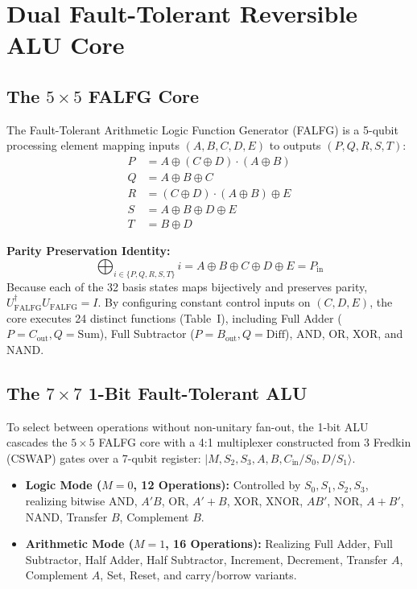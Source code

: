 \documentclass[10pt,twocolumn,letterpaper]{article}
\begin{document}
\section{Dual Fault-Tolerant Reversible ALU Core}

\subsection{The \texorpdfstring{$5\times 5$}{5x5} FALFG Core}
The Fault-Tolerant Arithmetic Logic Function Generator (FALFG) is a 5-qubit processing element mapping inputs $(A, B, C, D, E)$ to outputs $(P, Q, R, S, T)$:
\begin{align}
    P &= A \oplus (C \oplus D) \cdot (A \oplus B) \\
    Q &= A \oplus B \oplus C \\
    R &= (C \oplus D) \cdot (A \oplus B) \oplus E \\
    S &= A \oplus B \oplus D \oplus E \\
    T &= B \oplus D
\end{align}

\noindent\textbf{Parity Preservation Identity:}
\begin{equation}
    \bigoplus_{i \in \{P, Q, R, S, T\}} i = A \oplus B \oplus C \oplus D \oplus E = P_{\text{in}}
\end{equation}
Because each of the 32 basis states maps bijectively and preserves parity, $U_{\text{FALFG}}^\dagger U_{\text{FALFG}} = I$. By configuring constant control inputs on $(C, D, E)$, the core executes 24 distinct functions (Table~I), including Full Adder ($P=C_{\text{out}}, Q=\text{Sum}$), Full Subtractor ($P=B_{\text{out}}, Q=\text{Diff}$), AND, OR, XOR, and NAND.

\subsection{The \texorpdfstring{$7\times 7$}{7x7} 1-Bit Fault-Tolerant ALU}
To select between operations without non-unitary fan-out, the 1-bit ALU cascades the $5\times 5$ FALFG core with a 4:1 multiplexer constructed from 3 Fredkin (CSWAP) gates over a 7-qubit register: $|M, S_2, S_3, A, B, C_{\text{in}}/S_0, D/S_1\rangle$.
\begin{itemize}[leftmargin=1.15em, itemsep=0.5pt]
    \item \textbf{Logic Mode ($M=0$, 12 Operations):} Controlled by $S_0, S_1, S_2, S_3$, realizing bitwise AND, $A'B$, OR, $A'+B$, XOR, XNOR, $AB'$, NOR, $A+B'$, NAND, Transfer $B$, Complement $B$.
    \item \textbf{Arithmetic Mode ($M=1$, 16 Operations):} Realizing Full Adder, Full Subtractor, Half Adder, Half Subtractor, Increment, Decrement, Transfer $A$, Complement $A$, Set, Reset, and carry/borrow variants.
\end{itemize}
\end{document}
